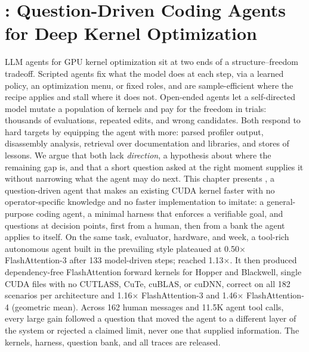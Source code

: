 \chapter{\KernelSeek: Question-Driven Coding Agents for Deep Kernel Optimization}
\label{ch:kernelseek}

\providecommand{\ksBaseline}{\textsc{Arsenal}\xspace}   %
\providecommand{\ksFaThree}{\texttt{fa3\_hopper.cu}\xspace}
\providecommand{\ksFaFour}{\texttt{fa4\_blackwell.cu}\xspace}

LLM agents for GPU kernel optimization sit at two ends of a structure--freedom tradeoff. Scripted
agents fix what the model does at each step, via a learned policy, an optimization menu, or fixed
roles, and are sample-efficient where the recipe applies and stall where it does not. Open-ended
agents let a self-directed model mutate a population of kernels and pay for the freedom in trials:
thousands of evaluations, repeated edits, and wrong candidates. Both respond to hard targets by
equipping the agent with more: parsed profiler output, disassembly analysis, retrieval over
documentation and libraries, and stores of lessons. We argue that both lack \emph{direction}, a
hypothesis about where the remaining gap is, and that a short question asked at the right moment
supplies it without narrowing what the agent may do next. This chapter presents \KernelSeek, a
question-driven agent that makes an existing CUDA kernel faster with no operator-specific knowledge
and no faster implementation to imitate: a general-purpose coding agent, a minimal harness that
enforces a verifiable goal, and questions at decision points, first from a human, then from a bank
the agent applies to itself. On the same task, evaluator, hardware, and week, a tool-rich autonomous
agent built in the prevailing style plateaued at 0.50$\times$ FlashAttention-3 after 133
model-driven steps; \KernelSeek reached 1.13$\times$. It then produced dependency-free
FlashAttention forward kernels for Hopper and Blackwell, single CUDA files with no CUTLASS, CuTe,
cuBLAS, or cuDNN, correct on all 182 scenarios per architecture and 1.16$\times$ FlashAttention-3
and 1.46$\times$ FlashAttention-4 (geometric mean). Across 162 human messages and 11.5K agent tool
calls, every large gain followed a question that moved the agent to a different layer of the system
or rejected a claimed limit, never one that supplied information. The kernels, harness, question
bank, and all traces are released.

